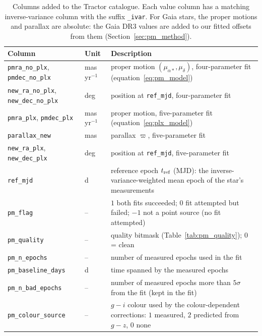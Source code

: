 \documentclass[usenatbib]{mnras}   %
\begin{document}
\begin{table}
    \centering
    \caption{Columns added to the Tractor catalogue. Each value column has a matching inverse-variance column with the suffix \texttt{\_ivar}. For Gaia stars, the proper motions and parallax are absolute: the Gaia DR3 values are added to our fitted offsets from them (Section~\ref{sec:pm_method}).}
    \label{tab:columns}
    \begin{tabular}{llp{11cm}}
        \hline
        Column & Unit & Description \\
        \hline
        \texttt{pmra\_no\_plx}, \texttt{pmdec\_no\_plx} & mas\,yr$^{-1}$ & proper motion $(\mu_{\alpha*}, \mu_\delta)$, four-parameter fit (equation~\ref{eq:pm_model}) \\
        \texttt{new\_ra\_no\_plx}, \texttt{new\_dec\_no\_plx} & deg & position at \texttt{ref\_mjd}, four-parameter fit \\
        \texttt{pmra\_plx}, \texttt{pmdec\_plx} & mas\,yr$^{-1}$ & proper motion, five-parameter fit (equation~\ref{eq:plx_model}) \\
        \texttt{parallax\_new} & mas & parallax $\varpi$, five-parameter fit \\
        \texttt{new\_ra\_plx}, \texttt{new\_dec\_plx} & deg & position at \texttt{ref\_mjd}, five-parameter fit \\
        \texttt{ref\_mjd} & d & reference epoch $t_{\rm ref}$ (MJD): the inverse-variance-weighted mean epoch of the star's measurements \\
        \texttt{pm\_flag} & -- & $1$ both fits succeeded; $0$ fit attempted but failed; $-1$ not a point source (no fit attempted) \\
        \texttt{pm\_quality} & -- & quality bitmask (Table~\ref{tab:pm_quality}); $0$ = clean \\
        \texttt{pm\_n\_epochs} & -- & number of measured epochs used in the fit \\
        \texttt{pm\_baseline\_days} & d & time spanned by the measured epochs \\
        \texttt{pm\_n\_bad\_epochs} & -- & number of measured epochs more than $5\sigma$ from the fit (kept in the fit) \\
        \texttt{pm\_colour\_source} & -- & $g-i$ colour used by the colour-dependent corrections: $1$ measured, $2$ predicted from $g-z$, $0$ none \\
        \hline
    \end{tabular}
\end{table}
\end{document}
